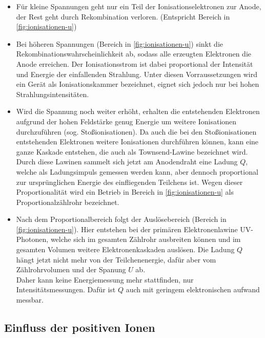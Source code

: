 \begin{itemize}
	\item Für kleine Spannungen geht nur ein Teil der Ionisationselektronen zur Anode, der Rest geht 
		durch Rekombination verloren. (Entspricht Bereich  in \autoref{fig:ionisationen-u})
	\item Bei höheren Spannungen (Bereich  in \autoref{fig:ionisationen-u})
		sinkt die Rekombinationswahrscheinlichkeit ab, sodass alle erzeugten Elektronen
		die Anode erreichen. Der Ionisationsstrom ist dabei proportional der Intensität und Energie
		der einfallenden Strahlung. Unter diesen Vorraussetzungen wird ein Gerät als Ionisationskammer
		bezeichnet, eignet sich jedoch nur bei hohen Strahlungsintensitäten.
	\item Wird die Spannung noch weiter erhöht, erhalten die entstehenden Elektronen aufgrund der hohen Feldstärke
		genug Energie um weitere Ionisationen durchzuführen (sog. Stoßionisationen). Da auch die bei den
		Stoßionisationen entstehenden Elektronen weitere Ionisationen durchführen können, kann eine ganze
		Kaskade entstehen, die auch als Townsend-Lawine bezeichnet wird.
		\\
		Durch diese Lawinen sammelt sich jetzt am Anodendraht eine Ladung $Q$, welche als Ladungsimpuls 
		gemessen werden kann, aber dennoch proportional zur ursprünglichen Energie des einfliegenden
		Teilchens ist. Wegen dieser Proportionalität wird ein Betrieb in Bereich  in 
		\autoref{fig:ionisationen-u} als Proportionalzählrohr bezeichnet.
	\item Nach dem Proportionalbereich folgt der Auslösebereich (Bereich  in
		\autoref{fig:ionisationen-u}). Hier entstehen bei der primären Elektronenlawine UV-Photonen, welche
		sich im gesamten Zählrohr ausbreiten können und im gesamten Volumen weitere Elektronenkaskaden auslösen.
		Die Ladung $Q$ hängt jetzt nicht mehr von der Teilchenenergie, dafür aber vom Zählrohrvolumen und der 
		Spanung $U$ ab.
		\\
		Daher kann keine Energiemessung mehr stattfinden, nur Intensitätsmessungen. Dafür ist $Q$ auch mit
		geringem elektronischen aufwand messbar.
\end{itemize}



\subsection{Einfluss der positiven Ionen}
\label{sec:einfluss-ionen}

